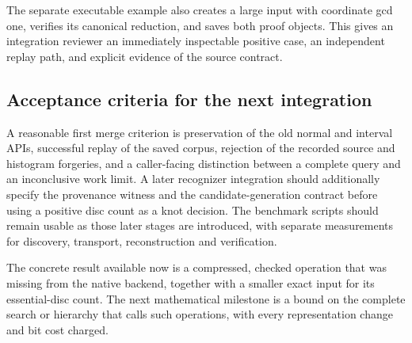 The separate executable example also creates a large input with coordinate
gcd one, verifies its canonical reduction, and saves both proof objects.
This gives an integration reviewer an immediately inspectable positive case,
an independent replay path, and explicit evidence of the source contract.

\subsection{Acceptance criteria for the next integration}

A reasonable first merge criterion is preservation of the old normal and
interval APIs, successful replay of the saved corpus, rejection of the
recorded source and histogram forgeries, and a caller-facing distinction
between a complete query and an inconclusive work limit. A later recognizer
integration should additionally specify the provenance witness and the
candidate-generation contract before using a positive disc count as a knot
decision. The benchmark scripts should remain usable as those later stages
are introduced, with separate measurements for discovery, transport,
reconstruction and verification.

The concrete result available now is a compressed, checked operation that
was missing from the native backend, together with a smaller exact input
for its essential-disc count. The next mathematical milestone is a bound on
the complete search or hierarchy that calls such operations, with every
representation change and bit cost charged.
